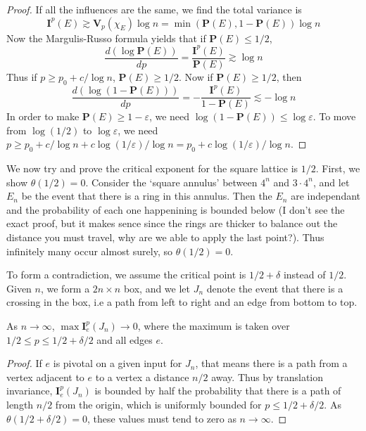\begin{proof}
    If all the influences are the same, we find the total variance is
    \[ \mathbf{I}^p(E) \gtrsim \mathbf{V}_p(\chi_E) \log n = \min (\mathbf{P}(E), 1 - \mathbf{P}(E)) \log n \]
    Now the Margulis-Russo formula yields that if $\mathbf{P}(E) \leq 1/2$,
    \[ \frac{d(\log \mathbf{P}(E))}{dp} = \frac{\mathbf{I}^p(E)}{\mathbf{P}(E)} \gtrsim \log n \]
    Thus if $p \geq p_0 + c/\log n$, $\mathbf{P}(E) \geq 1/2$. Now if $\mathbf{P}(E) \geq 1/2$, then
    \[ \frac{d(\log(1 - \mathbf{P}(E)))}{dp} = - \frac{\mathbf{I}^p(E)}{1 - \mathbf{P}(E)} \lesssim - \log n \]
    In order to make $\mathbf{P}(E) \geq 1-\varepsilon$, we need $\log(1 - \mathbf{P}(E)) \leq \log \varepsilon$. To move from $\log(1/2)$ to $\log \varepsilon$, we need $p \geq p_0 + c/\log n + c \log(1/\varepsilon)/\log n = p_0 + c \log(1/\varepsilon)/\log n$.
\end{proof}

We now try and prove the critical exponent for the square lattice is $1/2$. First, we show $\theta(1/2) = 0$. Consider the `square annulus' between $4^n$ and $3 \cdot 4^n$, and let $E_n$ be the event that there is a ring  in this annulus. Then the $E_n$ are independant and the probability of each one happenining is bounded below (I don't see the exact proof, but it makes sence since the rings are thicker to balance out the distance you must travel, why are we able to apply the last point?). Thus infinitely many occur almost surely, so $\theta(1/2) = 0$.

To form a contradiction, we assume the critical point is $1/2 + \delta$ instead of $1/2$. Given $n$, we form a $2n \times n$ box, and we let $J_n$ denote the event that there is a crossing in the box, i.e a path from left to right and an edge from bottom to top.

\begin{lemma}
    As $n \to \infty$, $\max \mathbf{I}_e^{p}(J_n) \to 0$, where the maximum is taken over $1/2 \leq p \leq 1/2 + \delta/2$ and all edges $e$.
\end{lemma}
\begin{proof}
    If $e$ is pivotal on a given input for $J_n$, that means there is a path from a vertex adjacent to $e$ to a vertex a distance $n/2$ away. Thus by translation invariance, $\mathbf{I}_e^p(J_n)$ is bounded by half the probability that there is a path of length $n/2$ from the origin, which is uniformly bounded for $p \leq 1/2 + \delta/2$. As $\theta(1/2 + \delta/2) = 0$, these values must tend to zero as $n \to \infty$.
\end{proof}

